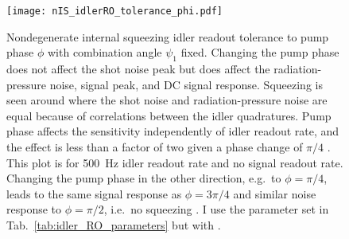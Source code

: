 \begin{figure}
    \centering
    \texttt{[image: nIS\_idlerRO\_tolerance\_phi.pdf]}
    \caption{  Nondegenerate internal squeezing idler readout tolerance to pump phase $\phi$ with combination angle $\psi_1$ fixed. Changing the pump phase does not affect the shot noise peak but does affect the radiation-pressure noise, signal peak, and DC signal response. Squeezing is seen around where the shot noise and radiation-pressure noise are equal  because of correlations between the idler quadratures. Pump phase affects the sensitivity independently of idler readout rate, and the effect is less than a factor of two given a phase change of $\pi/4$ . This plot is for 500~Hz idler readout rate and no signal readout rate. Changing the pump phase in the other direction, e.g.\ to $\phi=\pi/4$, leads to the same signal response as $\phi=3\pi/4$ and similar noise response to $\phi=\pi/2$, i.e.\ no squeezing . I use the parameter set in Tab.~\ref{tab:idler_RO_parameters} but with .}
    \label{fig:nIS_idlerRO_tolerance_phi}
\end{figure}

